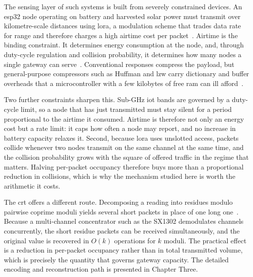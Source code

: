 \documentclass[12pt,a4paper,oneside]{book}
\begin{document}
The sensing layer of such systems is built from severely constrained devices.
An \gls{esp32} node operating on battery and harvested solar power must
transmit over kilometre-scale distances using \gls{lora}, a modulation scheme
that trades data rate for range and therefore charges a high airtime cost per
packet~\cite{raza2018lorawan, adelantado2017understanding}. Airtime is the
binding constraint. It determines energy consumption at the node, and, through
duty-cycle regulation and collision probability, it determines how many nodes a
single gateway can serve~\cite{mohammed2025loraEnergy}. Conventional responses
compress the payload, but general-purpose compressors such as Huffman and
\gls{lzw} carry dictionary and buffer overheads that a microcontroller with a
few kilobytes of free \gls{ram} can ill
afford~\cite{marcelloni2009energy, chen2025compression}.

Two further constraints sharpen this. Sub-GHz \gls{iot} bands are governed by a
duty-cycle limit, so a node that has just transmitted must stay silent for a
period proportional to the airtime it consumed. Airtime is therefore not only
an energy cost but a rate limit: it caps how often a node may report, and no
increase in battery capacity relaxes it. Second, because \gls{lora} uses
unslotted access, packets collide whenever two nodes transmit on the same
channel at the same time, and the collision probability grows with the square
of offered traffic in the regime that matters. Halving per-packet occupancy
therefore buys more than a proportional reduction in collisions, which is why
the mechanism studied here is worth the arithmetic it costs.

The \gls{crt} offers a different route. Decomposing a reading into residues
modulo pairwise coprime moduli yields several short packets in place of one
long one~\cite{garner1959residue, ding1996remainder}. Because a multi-channel
concentrator such as the SX1302 demodulates channels concurrently, the short
residue packets can be received simultaneously, and the original value is
recovered in $O(k)$ operations for $k$ moduli. The practical effect is a
reduction in per-packet occupancy rather than in total transmitted volume,
which is precisely the quantity that governs gateway capacity. The detailed
encoding and reconstruction path is presented in Chapter Three.
\end{document}
